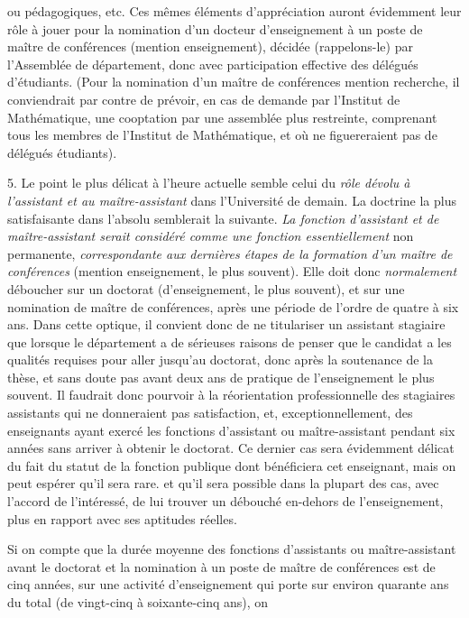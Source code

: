 \documentclass[11pt,a4paper]{article}
\begin{document}
ou pédagogiques, etc. Ces mêmes éléments d'appréciation auront évidemment leur rôle à jouer pour la nomination d'un docteur d'enseignement à un poste de maître de conférences (mention enseignement), décidée (rappelons-le) par l'Assemblée de département, donc avec participation effective des délégués d'étudiants. (Pour la nomination d'un maître de conférences mention recherche, il conviendrait par contre de prévoir, en cas de demande par l'Institut de Mathématique, une cooptation par une assemblée plus restreinte, comprenant tous les membres de l'Institut de Mathématique, et où ne figuereraient pas de délégués étudiants).

5. Le point le plus délicat à l'heure actuelle semble celui du \emph{rôle dévolu à l'assistant et au maître-assistant} dans l'Université de demain. La doctrine la plus satisfaisante dans l'absolu semblerait la suivante. \emph{La fonction d'assistant et de maître-assistant serait considéré comme une fonction essentiellement} non permanente, \emph{correspondante aux dernières étapes de la formation d'un maître de conférences} (mention enseignement, le plus souvent). Elle doit donc \emph{normalement} déboucher sur un doctorat (d'enseignement, le plus souvent), et sur une nomination de maître de conférences, après une période de l'ordre de quatre à six ans. Dans cette optique, il convient donc de ne titulariser un assistant stagiaire que lorsque le département a de sérieuses raisons de penser que le candidat a les qualités requises pour aller jusqu'au doctorat, donc après la soutenance de la thèse, et sans doute pas avant deux ans de pratique de l'enseignement le plus souvent. Il faudrait donc pourvoir à la réorientation professionnelle des stagiaires assistants qui ne donneraient pas satisfaction, et, exceptionnellement, des enseignants ayant exercé les fonctions d'assistant ou maître-assistant pendant six années sans arriver à obtenir le doctorat. Ce dernier cas sera évidemment délicat du fait du statut de la fonction publique dont bénéficiera cet enseignant, mais on peut espérer qu'il sera rare. et qu'il sera possible dans la plupart des cas, avec l'accord de l'intéressé, de lui trouver un débouché en-dehors de l'enseignement, plus en rapport avec ses aptitudes réelles.

Si on compte que la durée moyenne des fonctions d'assistants ou maître-assistant avant le doctorat et la nomination à un poste de maître de conférences est de cinq années, sur une activité d'enseignement qui porte sur environ quarante ans du total (de vingt-cinq à soixante-cinq ans), on
\end{document}
